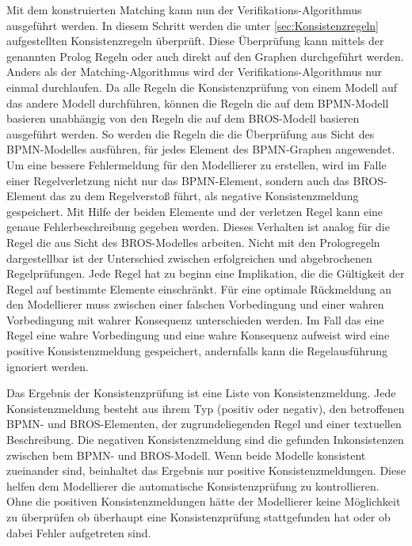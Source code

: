 Mit dem konstruierten Matching kann nun der Verifikations-Algorithmus ausgeführt werden.
In diesem Schritt werden die unter \cref{sec:Konsistenzregeln} aufgestellten Konsistenzregeln überprüft.
Diese Überprüfung kann mittels der genannten Prolog Regeln oder auch direkt auf den Graphen durchgeführt werden.
Anders als der Matching-Algorithmus wird der Verifikations-Algorithmus nur einmal durchlaufen.
Da alle Regeln die Konsistenzprüfung von einem Modell auf das andere Modell durchführen, können die Regeln die auf dem BPMN-Modell basieren unabhängig von den Regeln die auf dem BROS-Modell basieren ausgeführt werden.
So werden die Regeln die die Überprüfung aus Sicht des BPMN-Modelles ausführen, für jedes Element des BPMN-Graphen angewendet.
Um eine bessere Fehlermeldung für den Modellierer zu erstellen, wird im Falle einer Regelverletzung nicht nur das BPMN-Element, sondern auch das BROS-Element das zu dem Regelverstoß führt, als negative Konsistenzmeldung gespeichert.
Mit Hilfe der beiden Elemente und der verletzen Regel kann eine genaue Fehlerbeschreibung gegeben werden.
Dieses Verhalten ist analog für die Regel die aus Sicht des BROS-Modelles arbeiten.
Nicht mit den Prologregeln dargestellbar ist der Unterschied zwischen erfolgreichen und abgebrochenen Regelprüfungen.
Jede Regel hat zu beginn eine Implikation, die die Gültigkeit der Regel auf bestimmte Elemente einschränkt.
Für eine optimale Rückmeldung an den Modellierer muss zwischen einer falschen Vorbedingung und einer wahren Vorbedingung mit wahrer Konsequenz unterschieden werden.
Im Fall das eine Regel eine wahre Vorbedingung und eine wahre Konsequenz aufweist wird eine positive Konsistenzmeldung gespeichert, andernfalls kann die Regelausführung ignoriert werden.

Das Ergebnis der Konsistenzprüfung ist eine Liste von Konsistenzmeldung.
Jede Konsistenzmeldung besteht aus ihrem Typ (positiv oder negativ), den betroffenen BPMN- und BROS-Elementen, der zugrundeliegenden Regel und einer textuellen Beschreibung.
Die negativen Konsistenzmeldung sind die gefunden Inkonsistenzen zwischen bem BPMN- und BROS-Modell.
Wenn beide Modelle konsistent zueinander sind, beinhaltet das Ergebnis nur positive Konsistenzmeldungen.
Diese helfen dem Modellierer die automatische Konsistenzprüfung zu kontrollieren.
Ohne die positiven Konsistenzmeldungen hätte der Modellierer keine Möglichkeit zu überprüfen ob überhaupt eine Konsistenzprüfung stattgefunden hat oder ob dabei Fehler aufgetreten sind.
